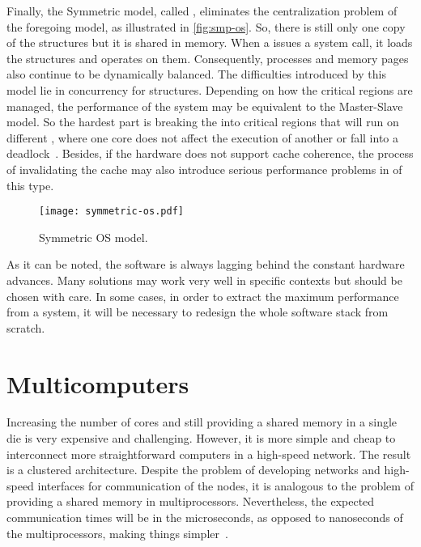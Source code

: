			Finally, the Symmetric model, called \smp, eliminates the centralization
			problem of the foregoing model, as illustrated in \autoref{fig:smp-os}.
			So, there is still only one copy of the \os structures but it is shared in memory.
			When a \cpu issues a system call, it loads the structures and operates on them.
			Consequently, processes and memory pages also continue to be dynamically balanced.
			The difficulties introduced by this model lie in concurrency for \os structures.
			Depending on how the critical regions are managed, the performance of the system
			may be equivalent to the Master-Slave model. So the hardest part is breaking the
			\os into critical regions that will run on different \cpus, where one core does
			not affect the execution of another or fall into a deadlock~\cite{tanenbaum:4ed}.
			Besides, if the hardware does not support cache coherence, the process of
			invalidating the cache may also introduce serious performance problems in \oss of this type.

			\begin{figure}[!tb]
				\centering%
				\caption{Symmetric OS model.}%
				\label{fig:smp-os}%
				\texttt{[image: symmetric-os.pdf]}%
			\end{figure}

			As it can be noted, the software is always lagging behind the constant hardware advances.
			Many solutions may work very well in specific contexts but should be chosen with care.
			In some cases, in order to extract the maximum performance from a system, it will be
			necessary to redesign the whole software stack from scratch.

	\section{Multicomputers}
	\label{sec.multicomputers}

		Increasing the number of cores and still providing a shared memory in a
		single die is very expensive and challenging.
		However, it is more simple and cheap to interconnect more straightforward
		computers in a high-speed network. The result is a clustered architecture.
		Despite the problem of developing networks and high-speed interfaces
		for communication of the nodes, it is analogous to the problem of
		providing a shared memory in multiprocessors.
		Nevertheless, the expected communication times will be in the
		microseconds, as opposed to nanoseconds of the multiprocessors,
		making things simpler~\cite{tanenbaum:4ed}.

